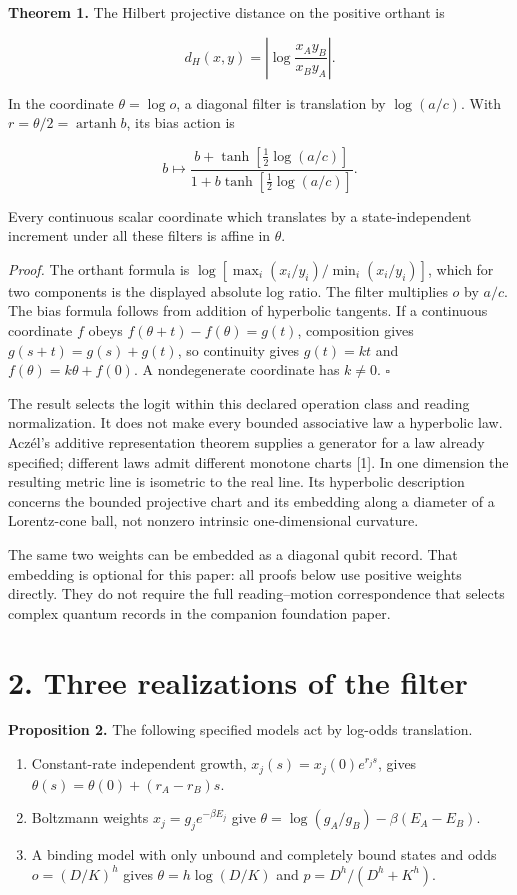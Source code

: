 \documentclass[
  11pt,
  a4paper,
]{article}
\providecommand{\tightlist}{%
  \setlength{\itemsep}{0pt}\setlength{\parskip}{0pt}}
\begin{document}
\textbf{Theorem 1.} The Hilbert projective distance on the positive orthant is

\[d_H(x,y)=\left|\log\frac{x_Ay_B}{x_By_A}\right|.
\]

In the coordinate \(\theta=\log o\), a diagonal filter is translation by \(\log(a/c)\). With \(r=\theta/2=\operatorname{artanh}b\), its bias action is

\[b\longmapsto\frac{b+\tanh\left[\frac12\log(a/c)\right]}
{1+b\tanh\left[\frac12\log(a/c)\right]}.\]

Every continuous scalar coordinate which translates by a state-independent increment under all these filters is affine in \(\theta\).

\emph{Proof.} The orthant formula is \(\log[\max_i(x_i/y_i)/\min_i(x_i/y_i)]\), which for two components is the displayed absolute log ratio. The filter multiplies \(o\) by \(a/c\). The bias formula follows from addition of hyperbolic tangents. If a continuous coordinate \(f\) obeys \(f(\theta+t)-f(\theta)=g(t)\), composition gives \(g(s+t)=g(s)+g(t)\), so continuity gives \(g(t)=kt\) and \(f(\theta)=k\theta+f(0)\). A nondegenerate coordinate has \(k\ne0\). \(\square\)

The result selects the logit within this declared operation class and reading normalization. It does not make every bounded associative law a hyperbolic law. Aczél's additive representation theorem supplies a generator for a law already specified; different laws admit different monotone charts {[}1{]}. In one dimension the resulting metric line is isometric to the real line. Its hyperbolic description concerns the bounded projective chart and its embedding along a diameter of a Lorentz-cone ball, not nonzero intrinsic one-dimensional curvature.

The same two weights can be embedded as a diagonal qubit record. That embedding is optional for this paper: all proofs below use positive weights directly. They do not require the full reading--motion correspondence that selects complex quantum records in the companion foundation paper.

\section{2. Three realizations of the filter}\label{three-realizations-of-the-filter}

\textbf{Proposition 2.} The following specified models act by log-odds translation.

\begin{enumerate}
\def\labelenumi{\arabic{enumi}.}
\tightlist
\item
  Constant-rate independent growth, \(x_j(s)=x_j(0)e^{r_js}\), gives \(\theta(s)=\theta(0)+(r_A-r_B)s\).
\item
  Boltzmann weights \(x_j=g_j e^{-\beta E_j}\) give \(\theta=\log(g_A/g_B)-\beta(E_A-E_B)\).
\item
  A binding model with only unbound and completely bound states and odds \(o=(D/K)^h\) gives \(\theta=h\log(D/K)\) and \(p=D^h/(D^h+K^h)\).
\end{enumerate}
\end{document}
